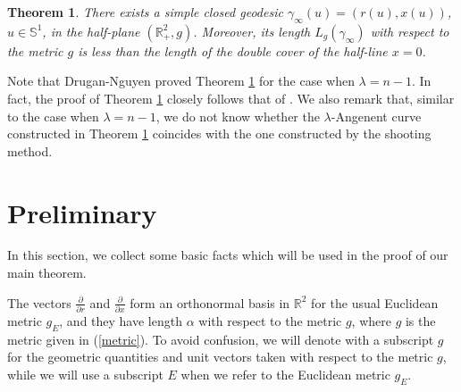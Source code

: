 \documentclass{amsart}
\newtheorem{theorem}{Theorem}[section]
\theoremstyle{Corollary}
\numberwithin{equation}{section}
\begin{document}
\begin{theorem}\label{main}
There exists a simple closed geodesic $\gamma_\infty(u)=(r(u),x(u))$, $u\in\mathbb{S}^1$,
in the half-plane $(\mathbb{R}^2_+,g)$.
Moreover, its length $L_g(\gamma_\infty)$ with respect to the metric $g$
is less than the length of the double cover of the half-line $x=0$.
\end{theorem}


Note that Drugan-Nguyen  \cite{Drugan&Nguyen} 
proved Theorem \ref{main} for the case when $\lambda=n-1$.
In fact, the proof of Theorem \ref{main} closely follows that of \cite{Drugan&Nguyen}.
We also remark that, similar to the case when $\lambda=n-1$,  
we do not know whether
the $\lambda$-Angenent curve constructed in Theorem \ref{main}
coincides with the one  constructed by the shooting method. 



\section{Preliminary}

In this section, we collect some basic facts which will be used 
in the proof of our main theorem. 

The vectors $\displaystyle\frac{\partial}{\partial r}$ and
$\displaystyle\frac{\partial}{\partial x}$ form an orthonormal basis in $\mathbb{R}^2$
for the usual Euclidean metric $g_E$,
and they have length $\alpha$ with respect to the metric $g$,
where $g$ is the metric given in (\ref{metric}). 
To avoid confusion, we will denote with a subscript $g$ 
for the geometric
quantities and unit vectors taken with respect to the metric $g$,
while we will use a subscript $E$ when we refer to the Euclidean metric $g_E$.
\end{document}
